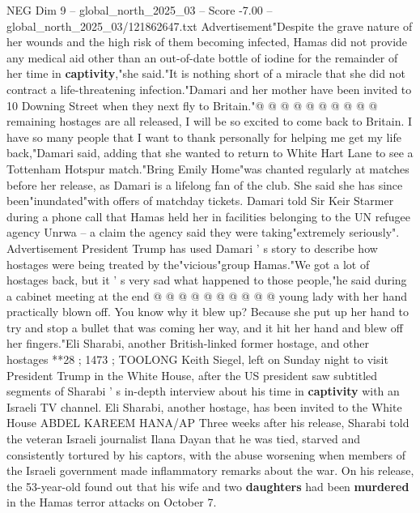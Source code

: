 \begin{textsample}{NEG Dim 9 – global\_north\_2025\_03 – Score -7.00 – global\_north\_2025\_03/121862647.txt}
Advertisement"Despite the grave nature of her wounds and the high risk of them becoming infected, Hamas did not provide any medical aid other than an out-of-date bottle of iodine for the remainder of her time in \textbf{captivity},"she said."It is nothing short of a miracle that she did not contract a life-threatening infection."Damari and her mother have been invited to 10 Downing Street when they next fly to Britain."@ @ @ @ @ @ @ @ @ @ remaining hostages are all released, I will be so excited to come back to Britain.
I have so many people that I want to thank personally for helping me get my life back,"Damari said, adding that she wanted to return to White Hart Lane to see a Tottenham Hotspur match."Bring Emily Home"was chanted regularly at matches before her release, as Damari is a lifelong fan of the club.
She said she has since been"inundated"with offers of matchday tickets.
Damari told Sir Keir Starmer during a phone call that Hamas held her in facilities belonging to the UN refugee agency Unrwa -- a claim the agency said they were taking"extremely seriously".
Advertisement President Trump has used Damari ' s story to describe how hostages were being treated by the"vicious"group Hamas."We got a lot of hostages back, but it ' s very sad what happened to those people,"he said during a cabinet meeting at the end @ @ @ @ @ @ @ @ @ @ young lady with her hand practically blown off.
You know why it blew up?
Because she put up her hand to try and stop a bullet that was coming her way, and it hit her hand and blew off her fingers."Eli Sharabi, another British-linked former hostage, and other hostages **28 ; 1473 ; TOOLONG Keith Siegel, left on Sunday night to visit President Trump in the White House, after the US president saw subtitled segments of Sharabi ' s in-depth interview about his time in \textbf{captivity} with an Israeli TV channel.
Eli Sharabi, another hostage, has been invited to the White House ABDEL KAREEM HANA/AP Three weeks after his release, Sharabi told the veteran Israeli journalist Ilana Dayan that he was tied, starved and consistently tortured by his captors, with the abuse worsening when members of the Israeli government made inflammatory remarks about the war.
On his release, the 53-year-old found out that his wife and two \textbf{daughters} had been \textbf{murdered} in the Hamas terror attacks on October 7.

\end{textsample}

